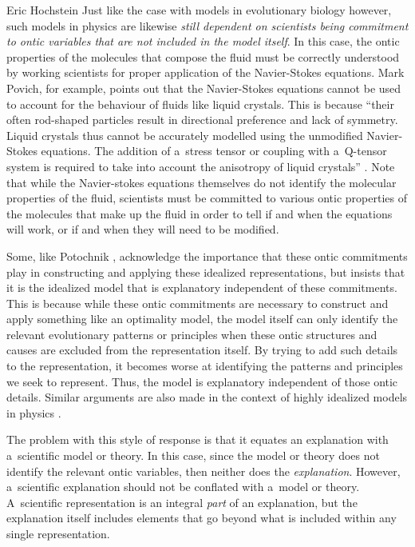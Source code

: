 \begin{artengenv}{Eric Hochstein}
Just like the case with models in evolutionary biology however, such models in physics are likewise \textit{still dependent on scientists being commitment to ontic variables that are not included in the model itself}. In this case, the ontic properties of the molecules that compose the fluid must be correctly understood by working scientists for proper application of the Navier-Stokes equations. Mark Povich, for example, points out that the Navier-Stokes equations cannot be used to account for the behaviour of fluids like liquid crystals. This is because ``their often rod-shaped particles result in directional preference and lack of symmetry. Liquid crystals thus cannot be accurately modelled using the unmodified Navier-Stokes equations. The addition of a~stress tensor or coupling with a~Q-tensor system is required to take into account the anisotropy of liquid crystals''
\parencite[][p.124]{povich_because_2018}. %
 Note that while the Navier-stokes equations themselves do not identify the molecular properties of the fluid, scientists must be committed to various ontic properties of the molecules that make up the fluid in order to tell if and when the equations will work, or if and when they will need to be modified.

Some, like Potochnik
\parencite*[][]{potochnik_explanatory_2010}, %
 acknowledge the importance that these ontic commitments play in constructing and applying these idealized representations, but insists that it is the idealized model that is explanatory independent of these commitments. This is because while these ontic commitments are necessary to construct and apply something like an optimality model, the model itself can only identify the relevant evolutionary patterns or principles when these ontic structures and causes are excluded from the representation itself. By trying to add such details to the representation, it becomes worse at identifying the patterns and principles we seek to represent. Thus, the model is explanatory independent of those ontic details. Similar arguments are also made in the context of highly idealized models in physics 
\parencites[see][]{batterman_devil_2002}[][]{batterman_minimal_2014}.%


The problem with this style of response is that it equates an explanation with a~scientific model or theory. In this case, since the model or theory does not identify the relevant ontic variables, then neither does the \textit{explanation}. However, a~scientific explanation should not be conflated with a~model or theory. A~scientific representation is an integral \textit{part} of an explanation, but the explanation itself includes elements that go beyond what is included within any single representation.


\end{artengenv}
